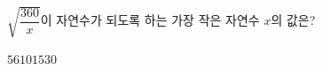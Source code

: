 $\sqrt{\dfrac{360}{x}}$이 자연수가 되도록 하는 가장 작은 자연수 $x$의 값은?
\begin{choices32}{$5$}{$6$}{$10$}{$15$}{$30$}\end{choices32}
